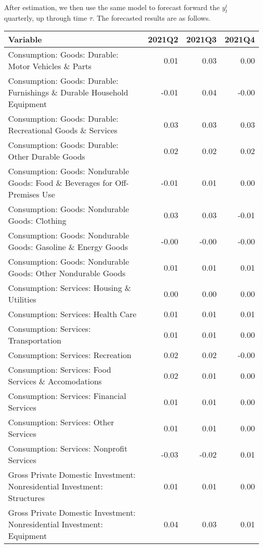 \documentclass[11pt, letterpaper]{article}\usepackage[]{graphicx}\usepackage[]{color}
\begin{document}
After estimation, we then use the same model to forecast forward the $y^i_t$ quarterly, up through time $\tau$. 
The forecasted results are as follows.
\begin{table}[H]
\centering
\begingroup\scriptsize
\begin{tabular}{lrrr}
  \hline
Variable & 2021Q2 & 2021Q3 & 2021Q4 \\ 
  \hline
Consumption: Goods: Durable: Motor Vehicles \& Parts & 0.01 & 0.03 & 0.00 \\ 
  Consumption: Goods: Durable: Furnishings \& Durable Household Equipment & -0.01 & 0.04 & -0.00 \\ 
  Consumption: Goods: Durable: Recreational Goods \& Services & 0.03 & 0.03 & 0.03 \\ 
  Consumption: Goods: Durable: Other Durable Goods & 0.02 & 0.02 & 0.02 \\ 
  Consumption: Goods: Nondurable Goods: Food \& Beverages for Off-Premises Use & -0.01 & 0.01 & 0.00 \\ 
  Consumption: Goods: Nondurable Goods: Clothing & 0.03 & 0.03 & -0.01 \\ 
  Consumption: Goods: Nondurable Goods: Gasoline \& Energy Goods & -0.00 & -0.00 & -0.00 \\ 
  Consumption: Goods: Nondurable Goods: Other Nondurable Goods & 0.01 & 0.01 & 0.01 \\ 
  Consumption: Services: Housing \& Utilities & 0.00 & 0.00 & 0.00 \\ 
  Consumption: Services: Health Care & 0.01 & 0.01 & 0.01 \\ 
  Consumption: Services: Transportation & 0.01 & 0.01 & 0.00 \\ 
  Consumption: Services: Recreation & 0.02 & 0.02 & -0.00 \\ 
  Consumption: Services: Food Services \& Accomodations & 0.02 & 0.01 & 0.00 \\ 
  Consumption: Services: Financial Services & 0.01 & 0.01 & 0.00 \\ 
  Consumption: Services: Other Services & 0.01 & 0.01 & 0.00 \\ 
  Consumption: Services: Nonprofit Services & -0.03 & -0.02 & 0.01 \\ 
  Gross Private Domestic Investment: Nonresidential Investment: Structures & 0.01 & 0.01 & 0.00 \\ 
  Gross Private Domestic Investment: Nonresidential Investment: Equipment & 0.04 & 0.03 & 0.01 \\ 

\end{tabular}
\end{table}
\end{document}
